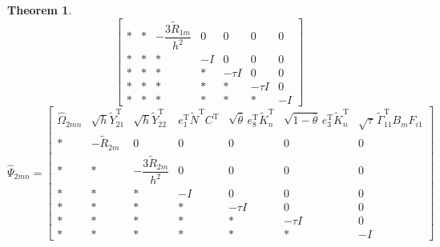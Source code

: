 \documentclass[preprint,review,fleqn,sort&compress,3p]{elsarticle}
\theoremstyle{definition} %
\theoremstyle{definition}%
\newtheorem{thm}{Theorem}[section]
\begin{document}
\begin{thm}
\begin{equation}
\begin{bmatrix}
			*
			&
			*
			&
			-\dfrac{3\widetilde R_{1m}}{h^2}
			&
			0
			&
			0
			&
			0
			&
			0
			\\[1.5ex]
			
			*
			&
			*
			&
			*
			&
			-I
			&
			0
			&
			0
			&
			0
			\\[1.5ex]
			
			*
			&
			*
			&
			*
			&
			*
			&
			-\tau I
			&
			0
			&
			0
			\\[1.5ex]
			
			*
			&
			*
			&
			*
			&
			*
			&
			*
			&
			-\tau I
			&
			0
			\\[1.5ex]
			
			*
			&
			*
			&
			*
			&
			*
			&
			*
			&
			*
			&
			-I
			
		\end{bmatrix}
	\end{equation}
\begin{equation}\label{LMI2_hat}
	\widehat{\Psi}_{2mn}=
	\begin{bmatrix}
		
		\widehat{\Omega}_{2mn}
		&
		\sqrt{h} \widetilde Y_{21}^{\mathrm{T}}
		&
		\sqrt{h} \widetilde Y_{22}^{\mathrm{T}}
		&
		e_1^{\mathrm{T}}\widetilde N^{\mathrm{T}}C^{\mathrm{T}}
		&
		\sqrt{\bar\theta}\,e_8^{\mathrm{T}}\widetilde K_n^{\mathrm{T}}
		&
		\sqrt{1-\bar\theta}\,e_3^{\mathrm{T}}\widetilde K_n^{\mathrm{T}}
		&
		\sqrt{\tau}\,
		\widetilde{\Gamma}_{11}^{\mathrm{T}}
		B_mF_{i1}
		\\[1.5ex]
		
		*
		&
		-\widetilde R_{2m}
		&
		0
		&
		0
		&
		0
		&
		0
		&
		0
		\\[1.5ex]
		
		*
		&
		*
		&
		-\dfrac{3\widetilde R_{2m}}{h^2}
		&
		0
		&
		0
		&
		0
		&
		0
		\\[1.5ex]
		
		*
		&
		*
		&
		*
		&
		-I
		&
		0
		&
		0
		&
		0
		\\[1.5ex]
		
		*
		&
		*
		&
		*
		&
		*
		&
		-\tau I
		&
		0
		&
		0
		\\[1.5ex]
		
		*
		&
		*
		&
		*
		&
		*
		&
		*
		&
		-\tau I
		&
		0
		\\[1.5ex]
		
		*
		&
		*
		&
		*
		&
		*
		&
		*
		&
		*
		&
		-I
		

\end{bmatrix}
\end{equation}
\end{thm}
\end{document}
